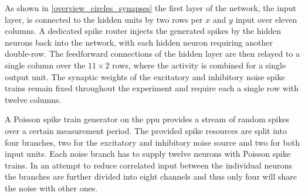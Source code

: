 As shown in \cref{overview_circles_synapses} the first layer of the network, the input layer, is connected to the hidden units by two rows per $x$ and $y$ input over eleven columns. A dedicated spike router injects the generated spikes by the hidden neurons back into the network, with each hidden neuron requiring another double-row. The feedforward connections of the hidden layer are then relayed to a single column over the $11 \times 2$ rows, where the activity is combined for a single output unit. The synaptic weights of the excitatory and inhibitory noise spike trains remain fixed throughout the experiment and require each a single row with twelve columns.

A Poisson spike train generator on the \gls{ppu} provides a stream of random spikes over a certain measurement period. The provided spike resources are split into four branches, two for the excitatory and inhibitory noise source and two for both input units. Each noise branch has to supply twelve neurons with Poisson spike trains. In an attempt to reduce correlated input between the individual neurons the branches are further divided into eight channels and thus only four will share the noise with other ones.

